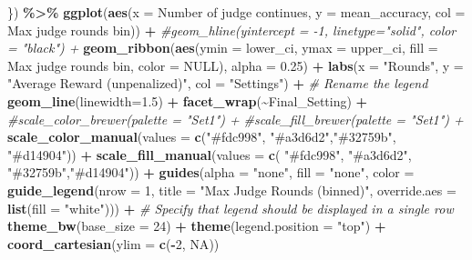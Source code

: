 \documentclass[
]{article}
\newenvironment{Shaded}{\begin{snugshade}}{\end{snugshade}}
\newcommand{\AttributeTok}[1]{\textcolor[rgb]{0.13,0.29,0.53}{#1}}
\newcommand{\CommentTok}[1]{\textcolor[rgb]{0.56,0.35,0.01}{\textit{#1}}}
\newcommand{\ConstantTok}[1]{\textcolor[rgb]{0.56,0.35,0.01}{#1}}
\newcommand{\DecValTok}[1]{\textcolor[rgb]{0.00,0.00,0.81}{#1}}
\newcommand{\FloatTok}[1]{\textcolor[rgb]{0.00,0.00,0.81}{#1}}
\newcommand{\FunctionTok}[1]{\textcolor[rgb]{0.13,0.29,0.53}{\textbf{#1}}}
\newcommand{\NormalTok}[1]{#1}
\newcommand{\SpecialCharTok}[1]{\textcolor[rgb]{0.81,0.36,0.00}{\textbf{#1}}}
\newcommand{\StringTok}[1]{\textcolor[rgb]{0.31,0.60,0.02}{#1}}
\begin{document}
\begin{Shaded}
\begin{Highlighting}[]
\NormalTok{  \}) }\SpecialCharTok{\%\textgreater{}\%}
  \FunctionTok{ggplot}\NormalTok{(}\FunctionTok{aes}\NormalTok{(}\AttributeTok{x =} \StringTok{\textasciigrave{}}\AttributeTok{Number of judge continues}\StringTok{\textasciigrave{}}\NormalTok{, }\AttributeTok{y =}\NormalTok{ mean\_accuracy, }\AttributeTok{col =} \StringTok{\textasciigrave{}}\AttributeTok{Max judge rounds bin}\StringTok{\textasciigrave{}}\NormalTok{)) }\SpecialCharTok{+}
  \CommentTok{\#geom\_hline(yintercept = {-}1, linetype="solid", color = "black") +}
  \FunctionTok{geom\_ribbon}\NormalTok{(}\FunctionTok{aes}\NormalTok{(}\AttributeTok{ymin =}\NormalTok{ lower\_ci, }\AttributeTok{ymax =}\NormalTok{ upper\_ci, }\AttributeTok{fill =} \StringTok{\textasciigrave{}}\AttributeTok{Max judge rounds bin}\StringTok{\textasciigrave{}}\NormalTok{, }\AttributeTok{color =} \ConstantTok{NULL}\NormalTok{), }\AttributeTok{alpha =} \FloatTok{0.25}\NormalTok{) }\SpecialCharTok{+}
  \FunctionTok{labs}\NormalTok{(}\AttributeTok{x =} \StringTok{"Rounds"}\NormalTok{, }
       \AttributeTok{y =} \StringTok{"Average Reward (unpenalized)"}\NormalTok{,}
       \AttributeTok{col =} \StringTok{"Settings"}\NormalTok{) }\SpecialCharTok{+}  \CommentTok{\# Rename the legend}
  \FunctionTok{geom\_line}\NormalTok{(}\AttributeTok{linewidth=}\FloatTok{1.5}\NormalTok{) }\SpecialCharTok{+}
  \FunctionTok{facet\_wrap}\NormalTok{(}\SpecialCharTok{\textasciitilde{}}\NormalTok{Final\_Setting) }\SpecialCharTok{+}
  \CommentTok{\#scale\_color\_brewer(palette = "Set1") +}
  \CommentTok{\#scale\_fill\_brewer(palette = "Set1") +}
  \FunctionTok{scale\_color\_manual}\NormalTok{(}\AttributeTok{values =} \FunctionTok{c}\NormalTok{(}\StringTok{"\#fdc998"}\NormalTok{, }\StringTok{"\#a3d6d2"}\NormalTok{,}\StringTok{"\#32759b"}\NormalTok{, }\StringTok{"\#d14904"}\NormalTok{)) }\SpecialCharTok{+}
  \FunctionTok{scale\_fill\_manual}\NormalTok{(}\AttributeTok{values =} \FunctionTok{c}\NormalTok{( }\StringTok{"\#fdc998"}\NormalTok{, }\StringTok{"\#a3d6d2"}\NormalTok{, }\StringTok{"\#32759b"}\NormalTok{,}\StringTok{"\#d14904"}\NormalTok{)) }\SpecialCharTok{+}
  \FunctionTok{guides}\NormalTok{(}\AttributeTok{alpha =} \StringTok{"none"}\NormalTok{, }\AttributeTok{fill =} \StringTok{"none"}\NormalTok{, }\AttributeTok{color =} \FunctionTok{guide\_legend}\NormalTok{(}\AttributeTok{nrow =} \DecValTok{1}\NormalTok{, }\AttributeTok{title =} \StringTok{"Max Judge Rounds (binned)"}\NormalTok{, }\AttributeTok{override.aes =} \FunctionTok{list}\NormalTok{(}\AttributeTok{fill =} \StringTok{"white"}\NormalTok{))) }\SpecialCharTok{+}  \CommentTok{\# Specify that legend should be displayed in a single row}
  \FunctionTok{theme\_bw}\NormalTok{(}\AttributeTok{base\_size =} \DecValTok{24}\NormalTok{) }\SpecialCharTok{+}
  \FunctionTok{theme}\NormalTok{(}\AttributeTok{legend.position =} \StringTok{"top"}\NormalTok{) }\SpecialCharTok{+}
  \FunctionTok{coord\_cartesian}\NormalTok{(}\AttributeTok{ylim =} \FunctionTok{c}\NormalTok{(}\SpecialCharTok{{-}}\DecValTok{2}\NormalTok{, }\ConstantTok{NA}\NormalTok{))}
\end{Highlighting}
\end{Shaded}
\end{document}
